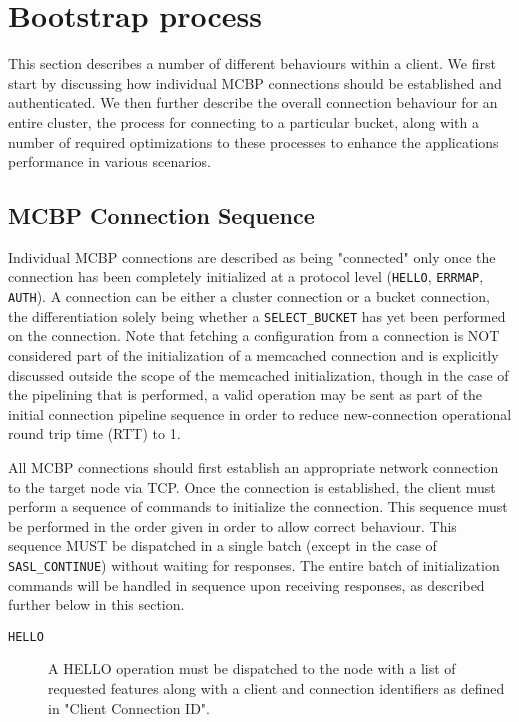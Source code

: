 \documentclass{report}
\begin{document}
\section{Bootstrap process}

This section describes a number of different behaviours within a client.  We first start by discussing how individual
MCBP connections should be established and authenticated.  We then further describe the overall connection behaviour for
an entire cluster, the process for connecting to a particular bucket, along with a number of required optimizations to
these processes to enhance the applications performance in various scenarios.

\subsection{MCBP Connection Sequence}

Individual MCBP connections are described as being "connected" only once the connection has been completely initialized
at a protocol level (\texttt{HELLO}, \texttt{ERRMAP}, \texttt{AUTH}). A connection can be either a cluster connection or
a bucket connection, the differentiation solely being whether a \texttt{SELECT\_BUCKET} has yet been performed on the
connection. Note that fetching a configuration from a connection is NOT considered part of the initialization of a
memcached connection and is explicitly discussed outside the scope of the memcached initialization, though in the case
of the pipelining that is performed, a valid operation may be sent as part of the initial connection pipeline sequence
in order to reduce new-connection operational round trip time (RTT) to 1.

All MCBP connections should first establish an appropriate network connection to the target node via TCP. Once the
connection is established, the client must perform a sequence of commands to initialize the connection. This sequence
must be performed in the order given in order to allow correct behaviour. This sequence MUST be dispatched in a single
batch (except in the case of \texttt{SASL\_CONTINUE}) without waiting for responses. The entire batch of initialization
commands will be handled in sequence upon receiving responses, as described further below in this section.

\begin{description}
    \item[\texttt{HELLO}]
        A HELLO operation must be dispatched to the node with a list of requested features along with a client
        and connection identifiers as defined in "Client Connection ID".
\end{description}
\end{document}
